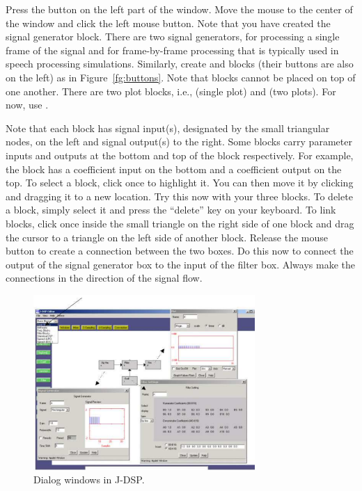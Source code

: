 Press the  button on the left part of the window. Move
the mouse to the center of the window and click the left mouse button.
Note that you have created the signal generator block. There are two
signal generators,  for processing a single frame of the
signal and  for frame-by-frame processing that is
typically used in speech processing simulations. Similarly, create
 and  blocks (their buttons are also on the
left) as in Figure~\ref{fg:buttons}. Note that blocks cannot be placed
on top of one another. There are two plot blocks, i.e., 
(single plot) and  (two plots). For now, use
.

Note that each block has signal input(s), designated by the small
triangular nodes, on the left and signal output(s) to the right. Some
blocks carry parameter inputs and outputs at the bottom and top of the
block respectively. For example, the  block has a
coefficient input on the bottom and a coefficient output on the
top. To select a block, click once to highlight it. You can then move
it by clicking and dragging it to a new location. Try this now with
your three blocks. To delete a block, simply select it and press the
``delete'' key on your keyboard. To link blocks, click once inside the
small triangle on the right side of one block and drag the cursor to a
triangle on the left side of another block. Release the mouse button
to create a connection between the two boxes. Do this now to connect
the output of the signal generator box to the input of the filter
box. Always make the connections in the direction of the signal flow.

\begin{figure}
\begin{center}
\includegraphics[width=0.75\textwidth]{lab1/image018}
\end{center}
\caption{Dialog windows in J-DSP.\label{fg:dialogs}}
\end{figure}

